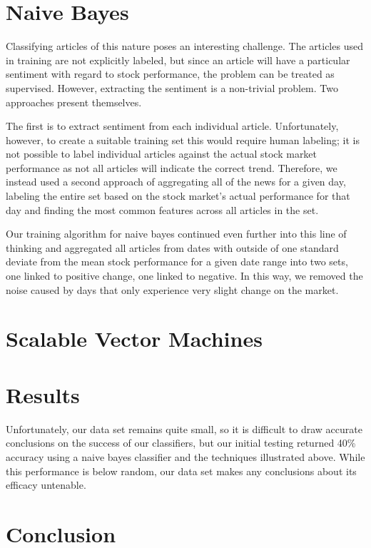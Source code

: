 \documentclass[letterpaper]{article}
\begin{document}
\section{Naive Bayes}
\noindent Classifying articles of this nature poses an interesting challenge. The articles used in training are not explicitly labeled, but since an article will have a particular sentiment with regard to stock performance, the problem can be treated as supervised. However, extracting the sentiment is a non-trivial problem. Two approaches present themselves. 

The first is to extract sentiment from each individual article. Unfortunately, however, to create a suitable training set this would require human labeling; it is not possible to label individual articles against the actual stock market performance as not all articles will indicate the correct trend. Therefore, we instead used a second approach of aggregating all of the news for a given day, labeling the entire set based on the stock market’s actual performance for that day and finding the most common features across all articles in the set. 

Our training algorithm for naive bayes continued even further into this line of thinking and aggregated all articles from dates with outside of one standard deviate from the mean stock performance for a given date range into two sets, one linked to positive change, one linked to negative. In this way, we removed the noise caused by days that only experience very slight change on the market.

\section{Scalable Vector Machines}


\section{Results}

Unfortunately, our data set remains quite small, so it is difficult to draw accurate conclusions on the success of our classifiers, but our initial testing returned 40\% accuracy using a naive bayes classifier and the techniques illustrated above. While this performance is below random, our data set makes any conclusions about its efficacy untenable.

\section{Conclusion}
\end{document}
